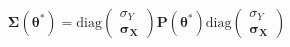 \begin{equation}
	\boldsymbol{\Sigma} \left( \boldsymbol{\theta}^{\ast} \right)
	=
	\mathrm{diag} 
	\left(
	\begin{array}{c}
		\sigma_{Y}                       \\
		\boldsymbol{\sigma}_{\mathbf{X}} 
	\end{array}
	\right)
	\mathbf{P} \left( \boldsymbol{\theta}^{\ast} \right)
	\mathrm{diag} 
	\left(
	\begin{array}{c}
		\sigma_{Y}                       \\
		\boldsymbol{\sigma}_{\mathbf{X}} 
	\end{array}
	\right)
	\label{eq:strRegression-sigmacap-of-thetastar}
\end{equation}
